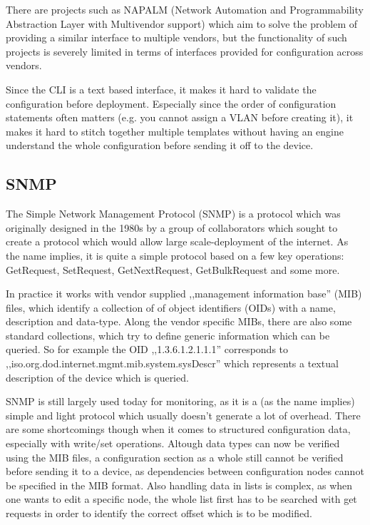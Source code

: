 There are projects such as NAPALM (Network Automation and Programmability Abstraction Layer with Multivendor support)\cite{noauthor_napalm_nodate}
which aim to solve the problem of providing a similar interface to multiple vendors,
but the functionality of such projects is severely limited in terms of interfaces provided
for configuration across vendors.

Since the \acrshort{CLI} is a text based interface, it makes it hard to validate the configuration
before deployment. Especially since the order of configuration statements often matters
(e.g. you cannot assign a VLAN before creating it), it makes it hard to stitch together
multiple templates without having an engine understand the whole configuration before sending
it off to the device.

\subsection{SNMP}

The Simple Network Management Protocol (SNMP)\cite{fedor_simple_1990} is a protocol which was originally
designed in the 1980s by a group of collaborators which sought to create a protocol which would
allow large scale-deployment of the internet.
As the name implies, it is quite a simple protocol based on a few key operations:
GetRequest, SetRequest, GetNextRequest, GetBulkRequest and some more.

In practice it works with vendor supplied ,,management information base'' (MIB) files, which identify a collection of
of object identifiers (OIDs) with a name, description and data-type. 
Along the vendor specific MIBs, there are also some standard collections,
which try to define generic information which can be queried.
So for example the OID ,,1.3.6.1.2.1.1.1'' corresponds to ,,iso.org.dod.internet.mgmt.mib.system.sysDescr''
which represents a textual description of the device which is queried.

SNMP is still largely used today for monitoring, as it is a (as the name implies) simple and light protocol
which usually doesn't generate a lot of overhead. There are some shortcomings though when it comes to
structured configuration data, especially with write/set operations. Altough data types can now be verified
using the MIB files, a configuration section as a whole still cannot be verified before sending it to a device,
as dependencies between configuration nodes cannot be specified in the MIB format. Also handling data
in lists is complex, as when one wants to edit a specific node, the whole list first has to be searched
with get requests in order to identify the correct offset which is to be modified.

